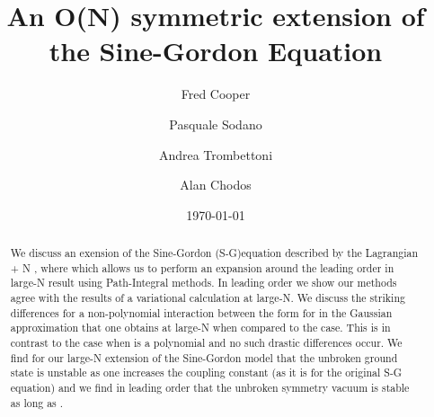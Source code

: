 \documentclass[a4paper,prd,preprint,superscriptaddress,showpacs,byrevtex]{revtex4}
\begin{document}
\title{An O(N) symmetric extension of the Sine-Gordon Equation }

\author{ Fred Cooper} 
\author{Pasquale Sodano}  
\author{Andrea Trombettoni} 
\author{Alan Chodos} 
 \date{\today}


\begin{abstract}
We discuss an \coordHE{} exension of the Sine-Gordon (S-G)equation described by
the
Lagrangian \coordHE{} + N
\coordHE{},  where \coordHE{} which allows us to  perform an expansion
around the leading order in large-N result using Path-Integral methods.  In
leading order we show our methods agree with the results of a variational
calculation at large-N. We discuss the striking differences for a
non-polynomial interaction between the form for \coordHE{} in
the Gaussian approximation that one obtains at  large-N when compared to the
\coordHE{} case.  This is in contrast to  the case when \coordHE{} is a
polynomial and no such drastic differences occur. We find for our large-N
extension of the Sine-Gordon model that  the unbroken ground state is
unstable
as one increases the coupling constant (as it is for the original S-G
equation) and we find in leading order that the unbroken symmetry vacuum is
stable as long as \myHighlight{$ \beta^2 \leq 24 \pi$}\coordHE{}.

\end{abstract}


%
\maketitle
%
\end{document}
